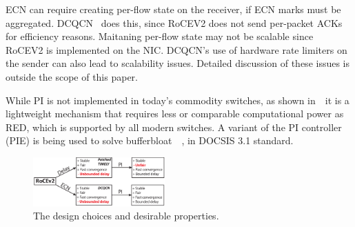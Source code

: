 ECN can require creating per-flow state on the receiver, if ECN marks must be
aggregated. DCQCN~\cite{dcqcn} does this, since RoCEV2 does not send per-packet
ACKs for efficiency reasons. Maitaning per-flow state may not be scalable since
RoCEV2 is implemented on the NIC.  DCQCN's use of hardware rate limiters on the
sender can also lead to scalability issues.  Detailed discussion of these issues
is outside the scope of this paper.

While PI is not implemented in today's commodity switches, as shown
in~\cite{hollot2001designing}~it is a lightweight mechanism that requires less
or comparable computational power as RED, which is supported by all modern
switches. A variant of the PI controller (PIE) is being used to solve
bufferbloat~\cite{conf/hpsr/PanNPPSBV13,bufferbloat-pi}~, in DOCSIS 3.1
standard.

\begin{figure}[t]
 \center
\includegraphics[width=0.45\textwidth]{figures/design_choice.eps}
\vspace{-0.5em}
 \caption{The design choices and desirable properties.}
\vspace{-1.5em}
\label{fig:design_choice}
\end{figure}


